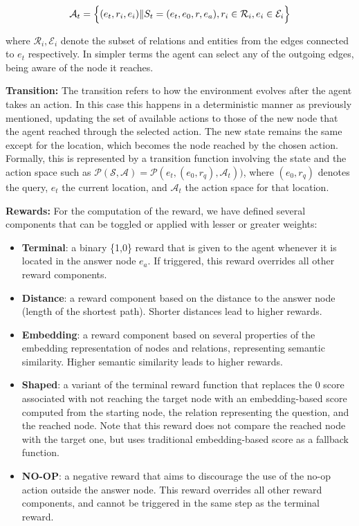 \begin{equation}
\label{eq:ActionSpace}
\mathcal{A}_t  = \Bigl\{ (e_t,r_i,e_i)  \|  S_t = (e_t,e_0,r,e_a) , r_i \in   \mathcal{R}_i ,  e_i \in   \mathcal{E}_i  \Bigl\}
\end{equation}


where $\mathcal{R}_i,\mathcal{E}_i$ denote the subset of relations and entities from the edges connected to $e_{t}$ respectively. In simpler terms the agent can select any of the outgoing edges, being aware of the node it reaches.

\textbf{Transition:} The transition refers to how the environment evolves after the agent takes an action. In this case this happens in a deterministic manner as previously mentioned, updating the set of available actions to those of the new node that the agent reached through the selected action. The new state remains the same except for the location, which becomes the node reached by the chosen action. Formally, this is represented by a transition function involving the state and the action space such as $\mathcal{P}( \mathcal{S,A} ) = \mathcal{P}(e_t ,(e_0,r_q), \mathcal{A} _t))$, where $(e_0,r_q)$ denotes the query, $e_t$ the current location, and  $\mathcal{A}_t$ the action space for that location.

\textbf{Rewards:} For the computation of the reward, we have defined several components that can be toggled or applied with lesser or greater weights:

\begin{itemize}
    \item \textbf{Terminal}: a binary \{1,0\} reward that is given to the agent whenever it is located in the answer node $e_a$. If triggered, this reward overrides all other reward components.
    \item \textbf{Distance}: a reward component based on the distance to the answer node (length of the shortest path). Shorter distances lead to higher rewards.
    \item \textbf{Embedding}: a reward component based on several properties of the embedding representation of nodes and relations, representing semantic similarity. Higher semantic similarity leads to higher rewards.
    \item \textbf{Shaped}: a variant of the terminal reward function that replaces the 0 score associated with not reaching the target node with an embedding-based score computed from the starting node, the relation representing the question, and the reached node. Note that this reward does not compare the reached node with the target one, but uses traditional embedding-based score as a fallback function.
    \item \textbf{NO-OP}: a negative reward that aims to discourage the use of the no-op action outside the answer node. This reward overrides all other reward components, and cannot be triggered in the same step as the terminal reward.
\end{itemize}

